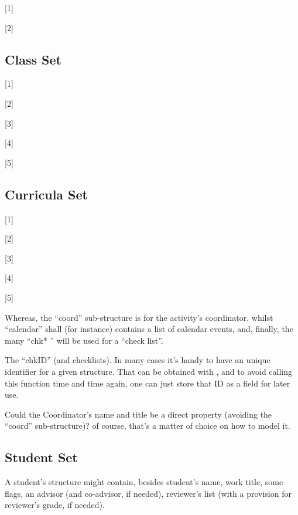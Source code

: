 \documentclass[10pt]{article}
\begin{document}
[1]

[2]


\subsection{Class Set}\label{classdef}



[1]

[2]

[3]

[4]

[5]

\subsection{Curricula Set}\label{curriculadef}


[1]

[2]

[3]

[4]

[5]

Whereas, the ``coord'' sub-structure is for the activity's coordinator, whilst ``calendar'' shall (for instance) contains a list of calendar events, and, finally, the many ``chk* '' will be used for a ``check list''.

\begin{tsremark}
The ``chkID'' (and checklists). In many cases it's handy to have an unique identifier for a given structure. That can be obtained with , and to avoid calling this function time and time again, one can just store that ID as a field for later use.
\end{tsremark}
\begin{tsremark}
  Could the Coordinator's name and title be a direct property (avoiding the ``coord'' sub-structure)? of course, that's a matter of choice on how to model it.
\end{tsremark}





\subsection{Student Set}\label{student.DataModel}
A student's structure might contain, besides student's name, work title, some flags, an advisor (and co-advisor, if needed), reviewer's list (with a provision for reviewer's grade, if needed).
\end{document}
